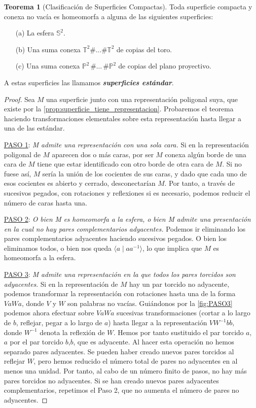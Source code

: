 \documentclass[10pt]{report}
\newcommand{\Esfera}{\mathbb{S}^2}
\newcommand{\Toro}{\mathbb{T}^2}
\newcommand{\Proyectivo}{\mathbb{P}^2}
\newcommand{\enfatiza}[1]{\textbf{\textit{#1}}}
\theoremstyle{definition}
\newtheorem{tma}[defin]{Teorema}
\begin{document}
\begin{tma}[Clasificación de Superficies Compactas]\label{teo:csc}
Toda superficie compacta y conexa no vacía es homeomorfa a alguna de las siguientes superficies:
\begin{itemize}
\item[(a)] La esfera $\Esfera$.
\item[(b)] Una suma conexa $\Toro \# \dots \# \Toro$ de copias del toro.
\item[(c)] Una suma conexa $\Proyectivo \,  \# \dots\, \# \Proyectivo$ de copias del plano proyectivo. 
\end{itemize}
A estas superficies las llamamos \enfatiza{superficies estándar}.
\end{tma}
\begin{proof}
Sea $M$ una superficie junto con una representación poligonal suya, que existe por la \autoref{prop:superficie_tiene_representacion}. Probaremos el teorema haciendo transformaciones elementales sobre esta representación hasta llegar a una de las estándar.

\underline{PASO 1}: \textit{M admite una representación con una sola cara.} Si en la representación poligonal de $M$ aparecen dos o más caras, por ser $M$ conexa algún borde de una cara de $M$ tiene que estar identificado con otro borde de otra cara de $M$. Si no fuese así, $M$ sería la unión de los cocientes de sus caras, y dado que cada uno de esos cocientes es abierto y cerrado, desconectarían $M$. Por tanto, a través de sucesivos pegados, con rotaciones y reflexiones si es necesario, podemos reducir el número de caras hasta una.

\underline{PASO 2}: \textit{O bien M es homeomorfa a la esfera, o bien M admite una presentación en la cual no hay pares complementarios adyacentes.} Podemos ir eliminando los pares complementarios adyacentes haciendo sucesivos pegados. O bien los eliminamos todos, o bien nos queda $\langle a\mid aa^{-1}\rangle$, lo que implica que $M$ es homeomorfa a la esfera.

\underline{PASO 3}: \textit{M admite una representación en la que todos los pares torcidos son adyacentes.} Si en la representación de $M$ hay un par torcido no adyacente, podemos transformar la representación con rotaciones hasta una de la forma $VaWa$, donde $V$ y $W$ son palabras no vacías. Guiándonos por la \autoref{fig:PASO3} podemos ahora efectuar sobre $VaWa$ sucesivas transformaciones (cortar a lo largo de $b$, reflejar, pegar a lo largo de $a$) hasta llegar a la representación $VW^{-1}bb$, donde $W^{-1}$ denota la reflexión de $W$. Hemos por tanto sustituido el par torcido $a$,$a$ por el par torcido $b$,$b$, que es adyacente. Al hacer esta operación no hemos separado pares adyacentes. Se pueden haber creado nuevos pares torcidos al reflejar $W$, pero hemos reducido el número total de pares no adyacentes en al menos una unidad. Por tanto, al cabo de un número finito de pasos, no hay más pares torcidos no adyacentes. Si se han creado nuevos pares adyacentes complementarios, repetimos el Paso 2, que no aumenta el número de pares no adyacentes.


\end{proof}
\end{document}
